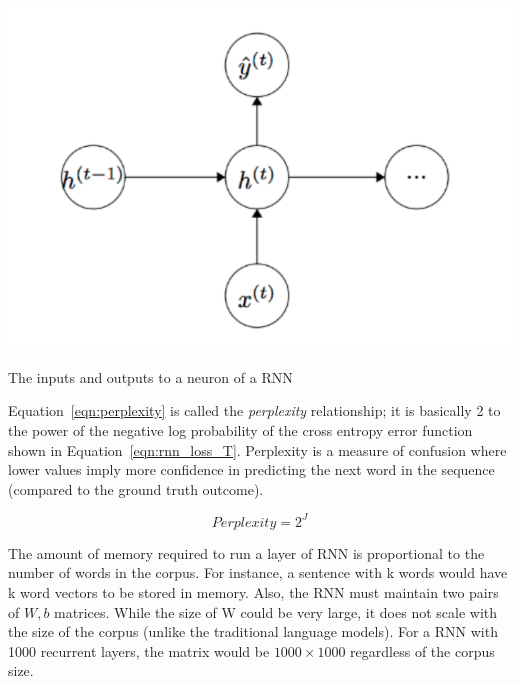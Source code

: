 \documentclass{tufte-handout}
\begin{document}
\begin{marginfigure}
	\centering
	\includegraphics[width=\linewidth]{rnn_node.pdf}
	\caption {The inputs and outputs to a neuron of a RNN}
	\label{fig:rnn_node}
\end{marginfigure}


Equation~\ref{eqn:perplexity} is called the \textit{perplexity} relationship; it is basically 2 to the power of the negative log probability of the cross entropy error function shown in Equation~\ref{eqn:rnn_loss_T}. Perplexity is a measure of confusion where lower values imply more confidence in predicting the next word in the sequence (compared to the ground truth outcome).

\begin{equation}
	Perplexity = 2^{J}
	\label{eqn:perplexity}
\end{equation}

The amount of memory required to run a layer of RNN is proportional to the number of words in the corpus. For instance, a sentence with k words would have k word vectors to be stored in memory. Also, the RNN must maintain two pairs of  $W, b$ matrices. While the size of W could be very large, it does not scale with the size of the corpus (unlike the traditional language models). For a RNN with 1000 recurrent layers, the matrix would be $1000 \times 1000$ regardless of the corpus size.
\end{document}

